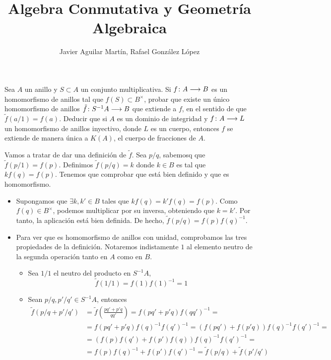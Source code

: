 \documentclass[twoside]{article}
\begin{document}
\title{Algebra Conmutativa y Geometría Algebraica}
\author{Javier Aguilar Martín, Rafael González López}
\maketitle

\begin{ejercicio}{1}
Sea $A$ un anillo y $S\subset A$ un conjunto multiplicativa. Si $f\colon{A}\longrightarrow{B}$ es un homomorfismo de anillos tal que $f(S)\subset B^\times$, probar que existe un único homomorfismo de anillos $\tilde{f}\colon{S^{-1}A}\longrightarrow{B}$ que extiende a $f$, en el sentido de que $\tilde{f}(a/1) = f(a)$.
\newline
Deducir que si $A$ es un dominio de integridad y $f\colon{A}\longrightarrow{L}$ un homomorfismo de anillos inyectivo, donde $L$ es un cuerpo, entonces $f$ se extiende de manera única a $K(A)$, el cuerpo de fracciones de $A$.
\begin{solucion}
Vamos a tratar de dar una definición de $\tilde{f}$. Sea $p/q$, sabemosq que $\tilde{f}(p/1)=f(p)$. Definimos $\tilde{f}(p/q)=k$ donde $k\in B$ es tal que $kf(q)=f(p)$. Tenemos que comprobar que está bien definido y que es homomorfismo.
\begin{itemize}
\item Supongamos que $\exists k,k'\in B$ tales que $kf(q)=k'f(q)=f(p)$. Como $f(q)\in B^\times$, podemos multiplicar por su inversa, obteniendo que $k=k'$. Por tanto, la aplicación está bien definida. De hecho, $\tilde{f}(p/q)=f(p)f(q)^{-1}$.
\item Para ver que es homomorfismo de anillos con unidad, comprobamos las tres propiedades de la definición. Notaremos indistamente $1$ al elemento neutro de la segunda operación tanto en $A$ como en $B$.
\begin{itemize}
\item Sea $1/1$ el neutro del producto en $S^{-1}A$, 
$$\tilde{f}(1/1)=f(1)f(1)^{-1}=1$$
\item Sean $p/q,p'/q' \in S^{-1}A$, entonces
\begin{align*}
\tilde{f}(p/q+p'/q') &= 	\tilde{f}\left(\frac{pq'+p'q}{qq'}\right) = f(pq'+p'q)f(qq')^{-1} = \\
 &= f(pq'+p'q)f(q)^{-1}f(q')^{-1} =
(f(pq')+f(p'q))f(q)^{-1}f(q')^{-1} = \\
&= (f(p)f(q')+f(p')f(q))f(q)^{-1}f(q')^{-1}  =\\
 &= f(p)f(q)^{-1}+f(p')f(q')^{-1} = \tilde{f}(p/q)+\tilde{f}(p'/q')
\end{align*}


\end{itemize}
\end{itemize}
\end{solucion}
\end{ejercicio}
\end{document}
